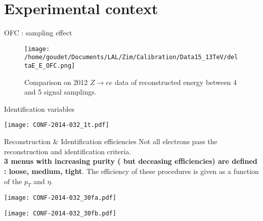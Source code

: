 \section{Experimental context}

\begin{frame}{OFC : sampling effect}
  \centering
  \begin{figure}[htbp]
    \texttt{[image: /home/goudet/Documents/LAL/Zim/Calibration/Data15\_13TeV/deltaE\_E\_OFC.png]}
    \caption{\label{fig:org3364702}
      Comparison on 2012 $Z\rightarrow ee$ data of reconstructed energy between 4 and 5 signal samplings.}
  \end{figure}
\end{frame}

\begin{frame}{Identification variables}
  \begin{center}
\texttt{[image: CONF-2014-032\_1t.pdf]}
\end{center}
\end{frame}

\begin{frame}{Reconstruction \& Identification efficiencies}
  Not all electrons pass the reconstruction and identification criteria. \\
  {\bf 3 menus with increasing purity ( but deceasing efficiencies) are defined : loose, medium, tight}.
  The efficiency of these procedures is given as a function of the $p_T$ and $\eta$.\\
\begin{minipage}{0.49\linewidth}
  \texttt{[image: CONF-2014-032\_30fa.pdf]}
\end{minipage}
\begin{minipage}{0.49\linewidth}
  \texttt{[image: CONF-2014-032\_30fb.pdf]}
\end{minipage}
\end{frame}


